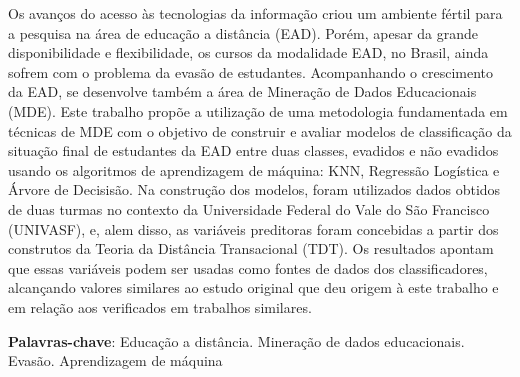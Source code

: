 \setlength{\absparsep}{18pt} %
\begin{resumo}

  Os avanços do acesso às tecnologias da informação criou um ambiente fértil
  para a pesquisa na área de educação a distância (EAD). Porém, apesar da grande
  disponibilidade e flexibilidade, os cursos da modalidade EAD, no Brasil, ainda
  sofrem com o problema da evasão de estudantes. Acompanhando o crescimento da
  EAD, se desenvolve também a área de Mineração de Dados Educacionais (MDE).
  Este trabalho propõe a utilização de uma metodologia fundamentada em técnicas
  de MDE com o objetivo de construir e avaliar modelos de classificação da
  situação final de estudantes da EAD entre duas classes, evadidos e não
  evadidos usando os algoritmos de aprendizagem de máquina: KNN, Regressão
  Logística e Árvore de Decisisão. Na construção dos modelos, foram utilizados
  dados obtidos de duas turmas no contexto da Universidade Federal do Vale do
  São Francisco (UNIVASF), e, alem disso, as variáveis preditoras foram
  concebidas a partir dos construtos da Teoria da Distância Transacional (TDT).
  Os resultados apontam que essas variáveis podem ser usadas como fontes de
  dados dos classificadores, alcançando valores similares ao estudo original que
  deu origem à este trabalho e em relação aos verificados em trabalhos
  similares.

  \textbf{Palavras-chave}: Educação a distância. Mineração de dados
  educacionais. Evasão. Aprendizagem de máquina

\end{resumo}
\newpage

